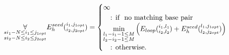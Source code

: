 \begin{equation*}
\underset{\substack{si_{1}-N \le i_{1} \le j_{1opt}\\si_{2}-N \le i_{2} \le j_{2opt}}}{\forall}\\
E_{h}^{seed}(\substack{i_1, j_{1opt}\\i_2, j_{2opt}}) = \begin{cases}
\infty\\
\quad\text{: if } \text{ no matching base pair }\\
\min\limits_{\substack{l_{1} - i_{1} - 1 \le M\\l_{2} - i_{2} - 1 \le M}}
\begin{pmatrix}
E_{loop}(\substack{i_1,l_1\\i_2,l_2}) + E_{h}^{seed}(\substack{l_1,j_{1opt}\\l_2,j_{2opt}})
\end{pmatrix}\\
\quad\text{: otherwise.}\\

\end{cases}
\end{equation*}


